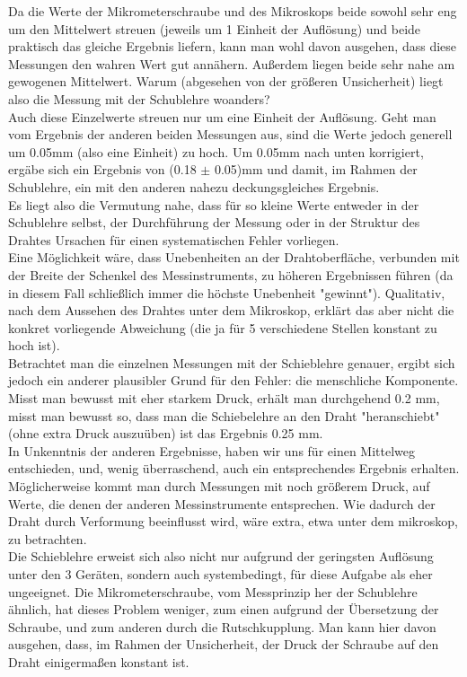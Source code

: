 \documentclass[12pt,a4paper]{article}
\begin{document}
\begin{multicols}{2}
Da die Werte der Mikrometerschraube und des Mikroskops beide sowohl sehr eng um den Mittelwert streuen (jeweils um 1 Einheit der Auflösung) und beide praktisch das gleiche Ergebnis liefern, kann man wohl davon ausgehen, dass diese Messungen den wahren Wert gut annähern. Außerdem liegen beide sehr nahe am gewogenen Mittelwert. Warum (abgesehen von der größeren Unsicherheit) liegt also die Messung mit der Schublehre woanders?\\
Auch diese Einzelwerte streuen nur um eine Einheit der Auflösung. Geht man vom Ergebnis der anderen beiden Messungen aus, sind die Werte jedoch generell um 0.05mm (also eine Einheit) zu hoch. Um 0.05mm nach unten korrigiert, ergäbe sich ein Ergebnis von (0.18 $\pm$ 0.05)mm und damit, im Rahmen der Schublehre, ein mit den anderen nahezu deckungsgleiches Ergebnis.\\
Es liegt also die Vermutung nahe, dass für so kleine Werte entweder in der Schublehre selbst, der Durchführung der Messung oder in der Struktur des Drahtes Ursachen für einen systematischen Fehler vorliegen.\\
Eine Möglichkeit wäre, dass Unebenheiten an der Drahtoberfläche, verbunden mit der Breite der Schenkel des Messinstruments, zu höheren Ergebnissen führen (da in diesem Fall schließlich immer die höchste Unebenheit "gewinnt"). Qualitativ, nach dem Aussehen des Drahtes unter dem Mikroskop, erklärt das aber nicht die konkret vorliegende Abweichung (die ja für 5 verschiedene Stellen konstant zu hoch ist).\\
Betrachtet man die einzelnen Messungen mit der Schieblehre genauer, ergibt sich jedoch ein anderer plausibler Grund für den Fehler: die menschliche Komponente.\\
Misst man bewusst mit eher starkem Druck, erhält man durchgehend 0.2 mm, misst man bewusst so, dass man die Schiebelehre an den Draht "heranschiebt" (ohne extra Druck auszuüben) ist das Ergebnis 0.25 mm.\\
In Unkenntnis der anderen Ergebnisse, haben wir uns für einen Mittelweg entschieden, und, wenig überraschend, auch ein entsprechendes Ergebnis erhalten. Möglicherweise kommt man durch Messungen mit noch größerem Druck, auf Werte, die denen der anderen Messinstrumente entsprechen. Wie dadurch der Draht durch Verformung beeinflusst wird, wäre extra, etwa unter dem mikroskop, zu betrachten.\\
Die Schieblehre erweist sich also nicht nur aufgrund der geringsten Auflösung unter den 3 Geräten, sondern auch systembedingt, für diese Aufgabe als eher ungeeignet. Die Mikrometerschraube, vom Messprinzip her der Schublehre ähnlich, hat dieses Problem weniger, zum einen aufgrund der Übersetzung der Schraube, und zum anderen durch die Rutschkupplung. Man kann hier davon ausgehen, dass, im Rahmen der Unsicherheit, der Druck der Schraube auf den Draht einigermaßen konstant ist.\\
\\


\end{multicols}
\end{document}
